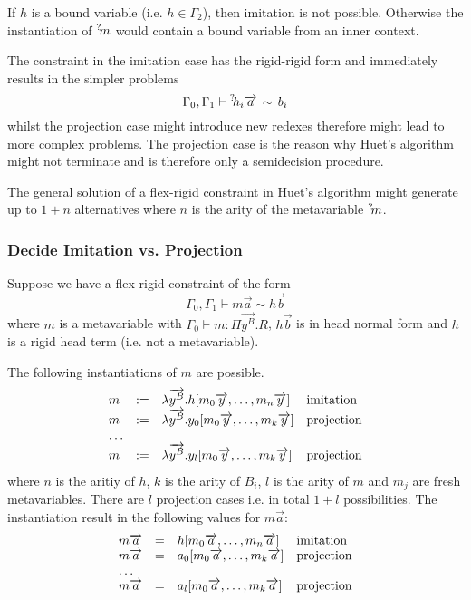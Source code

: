 If $h$ is a bound variable (i.e. $h\in \Gamma_2$), then imitation is not
possible. Otherwise the instantiation of ${{}^? \kern-0.2em m}$ would contain a bound
variable from an inner context.

The constraint in the imitation case has the rigid-rigid form and immediately
results in the simpler problems
$$
    \Gamma_0, \Gamma_1 \vdash {{}^? \kern-0.2em h}_i {\overrightarrow {a}} \,\sim\, b_i
$$
whilst the projection case might introduce new redexes therefore might lead to
more complex problems. The projection case is the reason why Huet's algorithm
might not terminate and is therefore only a semidecision procedure.

The general solution of a flex-rigid constraint in Huet's algorithm might
generate up to $1 + n$ alternatives where $n$ is the arity of the metavariable
${{}^? \kern-0.2em m}$.








\subsubsection{Decide Imitation vs. Projection}

Suppose we have a flex-rigid constraint of the form
$$
    \Gamma_0, \Gamma_1
    \vdash
    m \vec a \sim h \vec b
$$
where $m$ is a metavariable with
$\Gamma_0 \vdash m : \Pi \vec {y^B}. R$,
$h \vec b$ is in head normal form and $h$ is a
rigid head term (i.e. not a metavariable).

The following instantiations of $m$ are possible.
$$
\begin{array}{lllll} 
    m &:=&
    \lambda {\overrightarrow {y^B}}. h [m_0 {\overrightarrow {y}}, \ldots, m_n {\overrightarrow {y}}]
    & \text{imitation}
    \\
    m &:=&
    \lambda {\overrightarrow {y^B}}. y_0 [m_0 {\overrightarrow {y}}, \ldots, m_k {\overrightarrow {y}}]
    & \text{projection}
    \\
    \ldots
    \\
    m &:=&
    \lambda {\overrightarrow {y^B}}. y_l [m_0 {\overrightarrow {y}}, \ldots, m_k {\overrightarrow {y}}]
    & \text{projection}
 \end{array}
$$
where $n$ is the aritiy of $h$, $k$ is the arity of $B_i$, $l$ is the arity
of $m$ and $m_j$ are fresh metavariables. There are $l$ projection cases i.e. in
total $1+l$ possibilities. The instantiation result in the following values for
$m \vec a$:
$$
\begin{array}{lllll} 
    m {\overrightarrow {a}} &=&
    h [m_0 {\overrightarrow {a}}, \ldots, m_n {\overrightarrow {a}}]
    & \text{imitation}
    \\
    m {\overrightarrow {a}} &=&
    a_0 [m_0 {\overrightarrow {a}}, \ldots, m_k {\overrightarrow {a}}]
    & \text{projection}
    \\
    \ldots
    \\
    m {\overrightarrow {a}} &=&
    a_l [m_0 {\overrightarrow {a}}, \ldots, m_k {\overrightarrow {a}}]
    & \text{projection}
 \end{array}
$$

